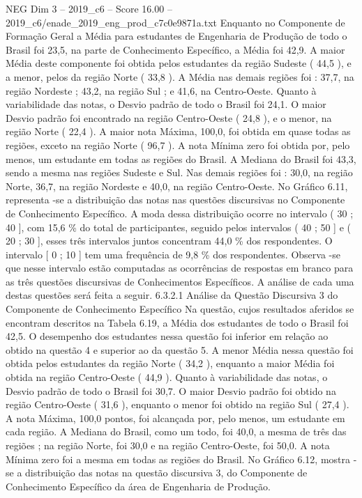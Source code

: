 \begin{textsample}{NEG Dim 3 – 2019\_c6 – Score 16.00 – 2019\_c6/enade\_2019\_eng\_prod\_c7c0e9871a.txt}
Enquanto no Componente de Formação Geral a Média para estudantes de Engenharia de Produção de todo o Brasil foi 23,5, na parte de Conhecimento Específico, a Média foi 42,9.
A maior Média deste componente foi obtida pelos estudantes da região Sudeste ( 44,5 ), e a menor, pelos da região Norte ( 33,8 ).
A Média nas demais regiões foi : 37,7, na região Nordeste ; 43,2, na região Sul ; e 41,6, na Centro-Oeste.
Quanto à variabilidade das notas, o Desvio padrão de todo o Brasil foi 24,1.
O maior Desvio padrão foi encontrado na região Centro-Oeste ( 24,8 ), e o menor, na região Norte ( 22,4 ).
A maior nota Máxima, 100,0, foi obtida em quase todas as regiões, exceto na região Norte ( 96,7 ).
A nota Mínima zero foi obtida por, pelo menos, um estudante em todas as regiões do Brasil.
A Mediana do Brasil foi 43,3, sendo a mesma nas regiões Sudeste e Sul.
Nas demais regiões foi : 30,0, na região Norte, 36,7, na região Nordeste e 40,0, na região Centro-Oeste.
No Gráfico 6.11, representa -se a distribuição das notas nas questões discursivas no Componente de Conhecimento Específico.
A moda dessa distribuição ocorre no intervalo ( 30 ; 40 ], com 15,6 \% do total de participantes, seguido pelos intervalos ( 40 ; 50 ] e ( 20 ; 30 ], esses três intervalos juntos concentram 44,0 \% dos respondentes.
O intervalo [ 0 ; 10 ] tem uma frequência de 9,8 \% dos respondentes.
Observa -se que nesse intervalo estão computadas as ocorrências de respostas em branco para as três questões discursivas de Conhecimentos Específicos.
A análise de cada uma destas questões será feita a seguir. 6.3.2.1 Análise da Questão Discursiva 3 do Componente de Conhecimento Específico Na questão, cujos resultados aferidos se encontram descritos na Tabela 6.19, a Média dos estudantes de todo o Brasil foi 42,5.
O desempenho dos estudantes nessa questão foi inferior em relação ao obtido na questão 4 e superior ao da questão 5.
A menor Média nessa questão foi obtida pelos estudantes da região Norte ( 34,2 ), enquanto a maior Média foi obtida na região Centro-Oeste ( 44,9 ).
Quanto à variabilidade das notas, o Desvio padrão de todo o Brasil foi 30,7.
O maior Desvio padrão foi obtido na região Centro-Oeste ( 31,6 ), enquanto o menor foi obtido na região Sul ( 27,4 ).
A nota Máxima, 100,0 pontos, foi alcançada por, pelo menos, um estudante em cada região.
A Mediana do Brasil, como um todo, foi 40,0, a mesma de três das regiões ; na região Norte, foi 30,0 e na região Centro-Oeste, foi 50,0.
A nota Mínima zero foi a mesma em todas as regiões do Brasil.
No Gráfico 6.12, mostra -se a distribuição das notas na questão discursiva 3, do Componente de Conhecimento Específico da área de Engenharia de Produção.

\end{textsample}
